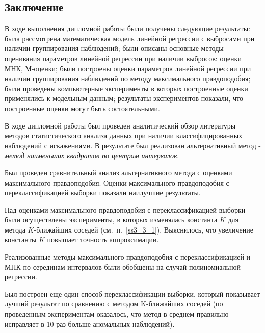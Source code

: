 \begin{center}
    \section*{Заключение}
\end{center}
{}
В ходе выполнения дипломной работы были получены следующие результаты: была рассмотрена математическая модель линейной регрессии с выбросами при наличии группирования наблюдений; были описаны основные методы оценивания параметров линейной регрессии при наличии выбросов: оценки МНК, М-оценки;
были построены оценки параметров линейной регрессии при наличии группирования наблюдений по методу максимального правдоподобия;
были проведены компьютерные эксперименты в которых построенные оценки применялись к модельным данным;
результаты экспериментов показали, что построенные оценки могут быть состоятельными.

В ходе дипломной работы был проведен аналитический обзор литературы методов статистического анализа данных при наличии классифицированных наблюдений с искажениями.
В результате был реализован альтернативный метод - \textit{метод наименьших квадратов по центрам интервалов}.

Был проведен сравнительный анализ альтернативного метода с оценками максимального правдоподобия. Оценки максимального правдоподобия с переклассификацией выборки показали наилучшие результаты. 

Над оценками максимального правдоподобия с переклассификацией выборки были осуществлены эксперименты, в которых изменялась константа $K$ для метода $K$-ближайших соседей (см.~п.~\ref{ss3_3_1}). Выяснилось, что увеличение константы $K$ повышает точность аппроксимации.

Реализованные методы максимального правдоподобия с переклассификацией и МНК по серединам интервалов  были обобщены на случай полиномиальной регрессии.

Был построен еще один способ переклассификации выборки, который показывает лучший результат по сравнению с методом K-ближайших соседей (по проведенным экспериментам оказалось, что метод в среднем правильно исправляет в 10 раз больше аномальных наблюдений).